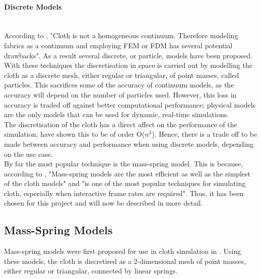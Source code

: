 \paragraph{Discrete Models}\leavevmode\\
According to \textcite[2]{Choi2002}, "Cloth is not a homogeneous continuum. Therefore modeling fabrics as a continuum and employing FEM or FDM has several potential drawbacks". As a result several discrete, or particle, models have been proposed.
\\With these techniques the discretisation in space is carried out by modelling the cloth as a discrete mesh, either regular or triangular, of point masses, called particles. This sacrifices some of the accuracy of continuum models, as the accuracy will depend on the number of particles used. However, this loss in accuracy is traded off against better computational performance; physical models are the only models that can be used for dynamic, real-time simulations.
\\The discretisation of the cloth has a direct affect on the performance of the simulation; \textcite{Volino2001} have shown this to be of order O($n^{3}$). Hence, there is a trade off to be made between accuracy and performance when using discrete models, depending on the use case.
\\By far the most popular technique is the mass-spring model. This is because, according to \textcite[2]{Zink2007}, "Mass-spring models are the most efficient as well as the simplest of the cloth models" and "is one of the most popular techniques for simulating cloth, especially when interactive frame rates are required". Thus, it has been chosen for this project and will now be described in more detail.

\subsection{Mass-Spring Models}
Mass-spring models were first proposed for use in cloth simulation in \textcite{Provot2001}. Using these models, the cloth is discretised as a 2-dimensional mesh of point masses, either regular or triangular, connected by linear springs.

